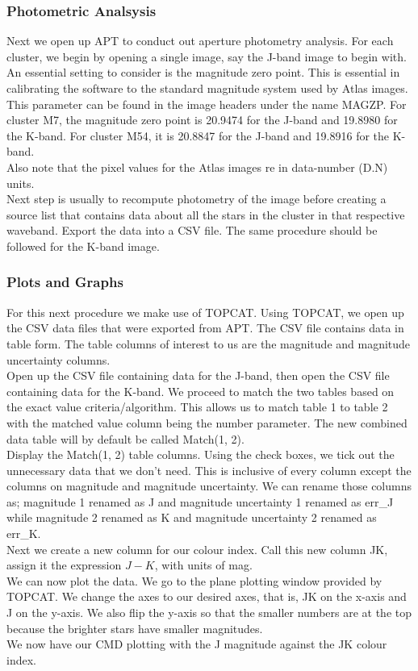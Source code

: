 \documentclass[12pt, twocolumn]{aastex62}
\begin{document}
		\subsubsection{Photometric Analsysis}
		Next we open up APT to conduct out aperture photometry analysis. For each cluster, we begin by opening a single image, say the J-band image to begin with. An essential setting to consider is the magnitude zero point. This is essential in calibrating the software to the standard magnitude system used by Atlas images. This parameter can be found in the image headers under the name MAGZP. For cluster M7, the magnitude zero point is 20.9474 for the J-band and 19.8980 for the K-band. For cluster M54, it is 20.8847 for the J-band and 19.8916 for the K-band.\\
		Also note that the pixel values for the Atlas images re in data-number (D.N) units.\\
		Next step is usually to recompute photometry of the image before creating a source list that contains data about all the stars in the cluster in that respective waveband. Export the data into a CSV file. The same procedure should be followed for the K-band image.
		\subsubsection{Plots and Graphs}
		For this next procedure we make use of TOPCAT. Using TOPCAT, we open up the CSV data files that were exported from APT. The CSV file contains data in table form. The table columns of interest to us are the magnitude and magnitude uncertainty columns.\\
		Open up the CSV file containing data for the J-band, then open the CSV file containing data for the K-band. We proceed to match the two tables based on the exact value criteria/algorithm. This allows us to match table 1 to table 2 with the matched value column being the number parameter. The new combined data table will by default be called Match(1, 2).\\
		Display the Match(1, 2) table columns. Using the check boxes, we tick out the unnecessary data that we don't need. This is inclusive of every column except the columns on magnitude and magnitude uncertainty. We can rename those columns as; magnitude 1 renamed as J and magnitude uncertainty 1 renamed as err\_J while magnitude 2 renamed as K and magnitude uncertainty 2 renamed as err\_K.\\
		Next we create a new column for our colour index. Call this new column JK, assign it the expression $J - K$, with units of mag.\\
		We can now plot the data. We go to the plane plotting window provided by TOPCAT. We change the axes to our desired axes, that is, JK on the x-axis and J on the y-axis. We also flip the y-axis so that the smaller numbers are at the top because the brighter stars have smaller magnitudes.\\
		We now have our CMD plotting with the J magnitude against the JK colour index.
\end{document}
